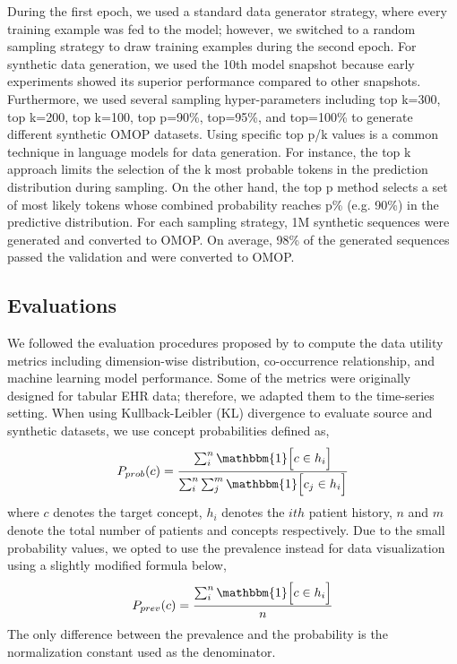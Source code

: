 \begin{multicols}{2}
During the first epoch, we used a standard data generator strategy, where every training example was fed to the model; however, we switched to a random sampling strategy to draw training examples during the second epoch. For synthetic data generation, we used the 10th model snapshot because early experiments showed its superior performance compared to other snapshots. Furthermore, we used several sampling hyper-parameters including top k=300, top k=200, top k=100, top p=90\%, top=95\%, and top=100\% to generate different synthetic OMOP datasets. Using specific top p/k values is a common technique in language models for data generation. For instance, the top k approach limits the selection of the k most probable tokens in the prediction distribution during sampling. On the other hand, the top p method selects a set of most likely tokens whose combined probability reaches p\% (e.g. 90\%) in the predictive distribution. For each sampling strategy, 1M synthetic sequences were generated and converted to OMOP. On average, 98\% of the generated sequences passed the validation and were converted to OMOP.

\subsection{Evaluations}
We followed the evaluation procedures proposed by \cite{Yan_Brad_2022} to compute the data utility metrics including dimension-wise distribution, co-occurrence relationship, and machine learning model performance. Some of the metrics were originally designed for tabular EHR data; therefore, we adapted them to the time-series setting. When using Kullback-Leibler (KL) divergence to evaluate source and synthetic datasets, we use concept probabilities defined as,
\[
P_{prob}(c)=\frac{\sum_i^n \mathbbm{1}\Big[c \in h_i \Big]}{\sum_i^n \sum_j^m \mathbbm{1} \Big[c_j \in h_i \Big]}
\]
where $c$ denotes the target concept, $h_i$ denotes the $ith$ patient history, $n$ and $m$  denote the total number of patients and concepts respectively. Due to the small probability values, we opted to use the prevalence instead for data visualization using a slightly modified formula below, 
\[
P_{prev}(c)=\frac{\sum_i^n \mathbbm{1}\Big[c \in h_i \Big]}{n}
\]
The only difference between the prevalence and the probability is the normalization constant used as the denominator. 


\end{multicols}
